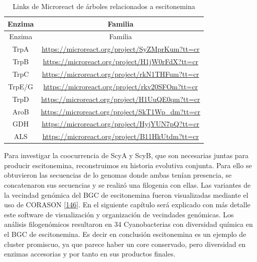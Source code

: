\documentclass[12pt,twoside]{reedthesis}
\begin{document}
  \begin{longtable}[]{@{}cc@{}}
  \caption{Links de Microreact de árboles relacionados a escitonemina
  \label{tab:Microreact}}\tabularnewline
  \toprule
  Enzima & Familia\tabularnewline
  \midrule
  \endfirsthead
  \toprule
  Enzima & Familia\tabularnewline
  \midrule
  \endhead
  TrpA &
  \url{https://microreact.org/project/SyZMprKum?tt=cr}\tabularnewline
  TrpB &
  \url{https://microreact.org/project/H1jW0rFdX?tt=cr}\tabularnewline
  TrpC &
  \url{https://microreact.org/project/rkN1THFum?tt=cr}\tabularnewline
  TrpE/G &
  \url{https://microreact.org/project/rkv20SFOm?tt=cr}\tabularnewline
  TrpD &
  \url{https://microreact.org/project/H1UuQE0qm?tt=cr}\tabularnewline
  AroB &
  \url{https://microreact.org/project/SkT1Wp_dm?tt=cr}\tabularnewline
  GDH &
  \url{https://microreact.org/project/HyjYUN7pQ?tt=cr}\tabularnewline
  ALS &
  \url{https://microreact.org/project/B11HkUtdm?tt=cr}\tabularnewline
  \bottomrule
  \end{longtable}
  
  Para investigar la coocurrencia de ScyA y ScyB, que son necesarias
  juntas para producir escitonemina, reconstruimos su historia evolutiva
  conjunta. Para ello se obtuvieron las secuencias de lo genomas donde
  ambas tenían presencia, se concatenaron sus secuencias y se realizó una
  filogenia con ellas. Las variantes de la vecindad genómica del BGC de
  escitonemina fueron visualizadas mediante el uso de CORASON
  {[}\protect\hyperlink{ref-navarro-munoz_computational_2018}{146}{]}. En
  el siguiente capítulo será explicado con más detalle este software de
  visualización y organización de vecindades genómicas. Los análisis
  filogenómicos resultaron en 34 Cyanobacterias con diversidad química en
  el BGC de escitonemina. Es decir en conclusión escitonemina es un
  ejemplo de cluster promiscuo, ya que parece haber un core conservado,
  pero diversidad en enzimas accesorias y por tanto en sus productos
  finales.
  
\end{document}
